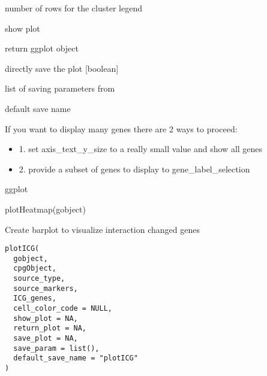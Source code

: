 \documentclass[a4paper]{book}
\begin{document}
\begin{Arguments}
\begin{ldescription}
\item[\code{legend\_nrows}] number of rows for the cluster legend

\item[\code{show\_plot}] show plot

\item[\code{return\_plot}] return ggplot object

\item[\code{save\_plot}] directly save the plot [boolean]

\item[\code{save\_param}] list of saving parameters from 

\item[\code{default\_save\_name}] default save name
\end{ldescription}
\end{Arguments}
%
\begin{Details}\relax
If you want to display many genes there are 2 ways to proceed:
\begin{itemize}

\item{} 1. set axis\_text\_y\_size to a really small value and show all genes
\item{} 2. provide a subset of genes to display to gene\_label\_selection

\end{itemize}

\end{Details}
%
\begin{Value}
ggplot
\end{Value}
%
\begin{Examples}
\begin{ExampleCode}
    plotHeatmap(gobject)
\end{ExampleCode}
\end{Examples}
%
\begin{Description}\relax
Create barplot to visualize interaction changed genes
\end{Description}
%
\begin{Usage}
\begin{verbatim}
plotICG(
  gobject,
  cpgObject,
  source_type,
  source_markers,
  ICG_genes,
  cell_color_code = NULL,
  show_plot = NA,
  return_plot = NA,
  save_plot = NA,
  save_param = list(),
  default_save_name = "plotICG"
)
\end{verbatim}
\end{Usage}
\end{document}

